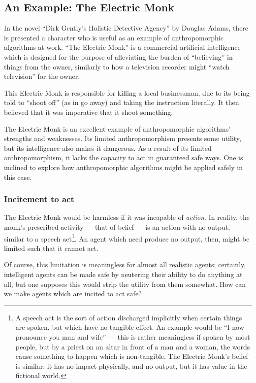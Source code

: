 \subsection{An Example: The Electric Monk}
In the novel ``Dirk Gently's Holistic Detective Agency'' by Douglas Adams, there is presented a character who is useful as an example of anthropomorphic algorithms at work. ``The Electric Monk'' is a commercial artificial intelligence which is designed for the purpose of alleviating the burden of ``believing'' in things from the owner, similarly to how a television recorder might ``watch television'' for the owner.\par

This Electric Monk is responsible for killing a local businessman, due to its being told to ``shoot off'' (as in go away) and taking the instruction literally. It then believed that it was imperative that it shoot something.\par

The Electric Monk is an excellent example of anthropomorphic algorithms' strengths and weaknesses. Its limited anthropomorphism presents some utility, but its intelligence also makes it dangerous. As a result of its limited anthropomorphism, it lacks the capacity to act in guaranteed safe ways. One is inclined to explore how anthropomorphic algorithms might be applied safely in this case.\par

\subsubsection{Incitement to act}
The Electric Monk would be harmless if it was incapable of \emph{action}. In reality, the monk's prescribed activity --- that of belief --- is an action with no output, similar to a speech act\footnote{A speech act is the sort of action discharged implicitly when certain things are spoken, but which have no tangible effect. An example would be ``I now pronounce you man and wife'' --- this is rather meaningless if spoken by most people, but by a priest on an altar in front of a man and a woman, the words cause something to happen which is non-tangible. The Electric Monk's belief is similar: it has no impact physically, and no output, but it has value in the fictional world.}. An agent which need produce no output, then, might be limited such that it cannot act.\par

Of course, this limitation is meaningless for almost all realistic agents; certainly, intelligent agents can be made safe by neutering their ability to do anything at all, but one supposes this would strip the utility from them somewhat. How can we make agents which are incited to act safe?\par

